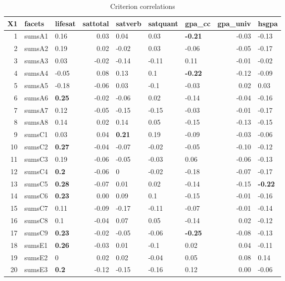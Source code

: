 \documentclass[man]{apa6}
\theoremstyle{definition}
\theoremstyle{definition}
\theoremstyle{definition}
\theoremstyle{remark}
\begin{document}
\begin{table}[ht]
\centering
\caption{Criterion correlations} 
\begingroup\fontsize{5.5pt}{4.5pt}\selectfont
\begin{tabular}{rllrlllrl}
  \hline
X1 & facets & lifesat & sattotal & satverb & satquant & gpa\_cc & gpa\_univ & hsgpa \\ 
  \hline
  1 & sumsA1 & 0.16 & 0.03 & 0.04 & 0.03 & \textbf{-0.21} & -0.03 & -0.13 \\ 
    2 & sumsA2 & 0.19 & 0.02 & -0.02 & 0.03 & -0.06 & -0.05 & -0.17 \\ 
    3 & sumsA3 & 0.03 & -0.02 & -0.14 & -0.11 & 0.11 & -0.01 & -0.02 \\ 
    4 & sumsA4 & -0.05 & 0.08 & 0.13 & 0.1 & \textbf{-0.22} & -0.12 & -0.09 \\ 
    5 & sumsA5 & -0.18 & -0.06 & 0.03 & -0.1 & -0.03 & 0.02 & 0.03 \\ 
    6 & sumsA6 & \textbf{0.25} & -0.02 & -0.06 & 0.02 & -0.14 & -0.04 & -0.16 \\ 
    7 & sumsA7 & 0.12 & -0.05 & -0.15 & -0.15 & -0.03 & -0.01 & -0.17 \\ 
    8 & sumsA8 & 0.14 & 0.02 & 0.14 & 0.05 & -0.15 & -0.13 & -0.15 \\ 
    9 & sumsC1 & 0.03 & 0.04 & \textbf{0.21} & 0.19 & -0.09 & -0.03 & -0.06 \\ 
   10 & sumsC2 & \textbf{0.27} & -0.04 & -0.07 & -0.02 & -0.05 & -0.10 & -0.12 \\ 
   11 & sumsC3 & 0.19 & -0.06 & -0.05 & -0.03 & 0.06 & -0.06 & -0.13 \\ 
   12 & sumsC4 & \textbf{0.2} & -0.06 & 0 & -0.02 & -0.18 & -0.07 & -0.17 \\ 
   13 & sumsC5 & \textbf{0.28} & -0.07 & 0.01 & 0.02 & -0.14 & -0.15 & \textbf{-0.22} \\ 
   14 & sumsC6 & \textbf{0.23} & 0.00 & 0.09 & 0.1 & -0.15 & -0.01 & -0.16 \\ 
   15 & sumsC7 & 0.11 & -0.09 & -0.17 & -0.11 & -0.07 & -0.01 & -0.14 \\ 
   16 & sumsC8 & 0.1 & -0.04 & 0.07 & 0.05 & -0.14 & 0.02 & -0.12 \\ 
   17 & sumsC9 & \textbf{0.23} & -0.02 & -0.05 & -0.06 & \textbf{-0.25} & -0.08 & -0.13 \\ 
   18 & sumsE1 & \textbf{0.26} & -0.03 & 0.01 & -0.1 & 0.02 & 0.04 & -0.11 \\ 
   19 & sumsE2 & 0 & 0.02 & 0.02 & -0.04 & 0.05 & 0.08 & 0.14 \\ 
   20 & sumsE3 & \textbf{0.2} & -0.12 & -0.15 & -0.16 & 0.12 & 0.00 & -0.06 \\ 

\end{tabular}
\end{table}
\end{document}
